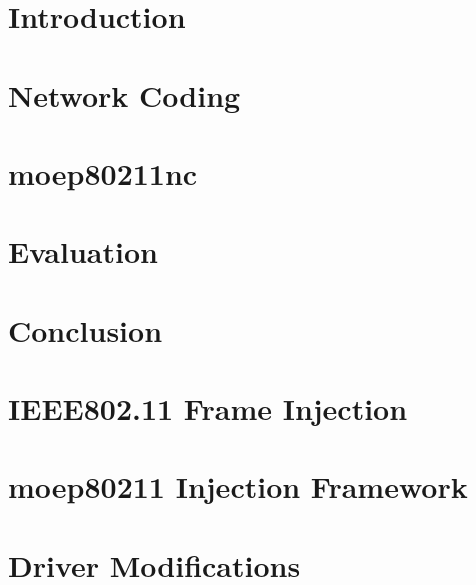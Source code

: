 \chapter{Introduction}

\chapter{Network Coding}

\chapter{moep80211nc}

\chapter{Evaluation}

\chapter{Conclusion}

\appendix
\chapter{IEEE802.11 Frame Injection}
\chapter{moep80211 Injection Framework}
\chapter{Driver Modifications}



